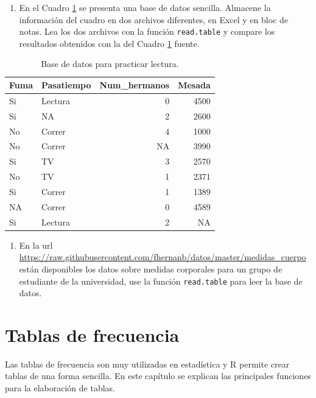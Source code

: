 \documentclass[
]{book}
\providecommand{\tightlist}{%
  \setlength{\itemsep}{0pt}\setlength{\parskip}{0pt}}
\begin{document}
\begin{enumerate}
\def\labelenumi{\arabic{enumi}.}
\tightlist
\item
  En el Cuadro \ref{tab:toy} se presenta una base de datos sencilla. Almacene la información del cuadro en dos archivos diferentes, en Excel y en bloc de notas. Lea los dos archivos con la función \texttt{read.table} y compare los resultados obtenidos con la del Cuadro \ref{tab:toy} fuente.
\end{enumerate}

\begin{table}

\caption{\label{tab:toy}Base de datos para practicar lectura.}
\centering
\begin{tabular}[t]{llrr}
\toprule
Fuma & Pasatiempo & Num\_hermanos & Mesada\\
\midrule
Si & Lectura & 0 & 4500\\
Si & NA & 2 & 2600\\
No & Correr & 4 & 1000\\
No & Correr & NA & 3990\\
Si & TV & 3 & 2570\\
\addlinespace
No & TV & 1 & 2371\\
Si & Correr & 1 & 1389\\
NA & Correr & 0 & 4589\\
Si & Lectura & 2 & NA\\
\bottomrule
\end{tabular}
\end{table}

\begin{enumerate}
\def\labelenumi{\arabic{enumi}.}
\setcounter{enumi}{1}
\tightlist
\item
  En la url \url{https://raw.githubusercontent.com/fhernanb/datos/master/medidas_cuerpo} están disponibles los datos sobre medidas corporales para un grupo de estudiante de la universidad, use la función \texttt{read.table} para leer la base de datos.
\end{enumerate}

\hypertarget{tablas}{%
\chapter{Tablas de frecuencia}\label{tablas}}

Las tablas de frecuencia son muy utilizadas en estadística y R permite crear tablas de una forma sencilla. En este capítulo se explican las principales funciones para la elaboración de tablas.
\end{document}
